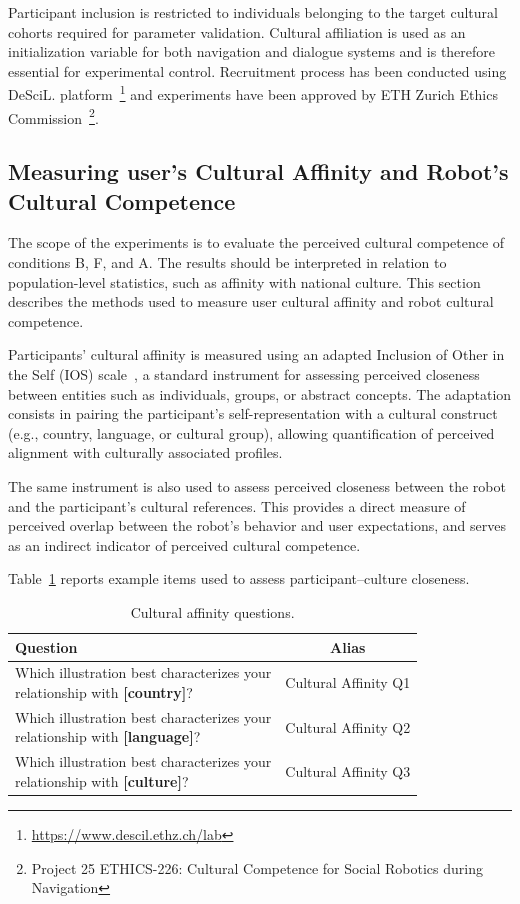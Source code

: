 Participant inclusion is restricted to individuals belonging to the target cultural cohorts required for parameter validation. Cultural affiliation is used as an initialization variable for both navigation and dialogue systems and is therefore essential for experimental control.
Recruitment process has been conducted using DeSciL. platform~\footnote{\href{https://www.descil.ethz.ch/lab}{https://www.descil.ethz.ch/lab}} and experiments have been approved by ETH Zurich Ethics Commission~\footnote{Project 25 ETHICS-226: Cultural Competence for Social Robotics during Navigation}.

\subsection{Measuring user's Cultural Affinity and Robot's Cultural Competence}
\label{ch5:sec:measuring_cultural_competence}

The scope of the experiments is to evaluate the perceived cultural competence of conditions B, F, and A. The results should be interpreted in relation to population-level statistics, such as affinity with national culture. This section describes the methods used to measure user cultural affinity and robot cultural competence.

Participants' cultural affinity is measured using an adapted Inclusion of Other in the Self (IOS) scale~\citep{aron1999relationship}, a standard instrument for assessing perceived closeness between entities such as individuals, groups, or abstract concepts. The adaptation consists in pairing the participant’s self-representation with a cultural construct (e.g., country, language, or cultural group), allowing quantification of perceived alignment with culturally associated profiles.

The same instrument is also used to assess perceived closeness between the robot and the participant’s cultural references. This provides a direct measure of perceived overlap between the robot’s behavior and user expectations, and serves as an indirect indicator of perceived cultural competence.

Table~\ref{tab:cultural_affinity_questions} reports example items used to assess participant--culture closeness.

\begin{table}[]
\centering
\begin{tabular}{l|c}
\textbf{Question} & \textbf{Alias} \\
\midrule
\makecell[l]{Which illustration best characterizes your \\ relationship with \textbf{[country]}?} & Cultural Affinity Q1 \\
\makecell[l]{Which illustration best characterizes your \\ relationship with \textbf{[language]}?} & Cultural Affinity Q2 \\
\makecell[l]{Which illustration best characterizes your \\ relationship with \textbf{[culture]}?} & Cultural Affinity Q3 \\
\end{tabular}
\caption{Cultural affinity questions.}
\label{tab:cultural_affinity_questions}
\end{table}

